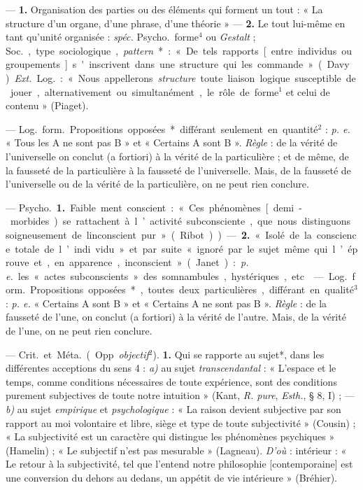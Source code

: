 \begin{itemize}[leftmargin=1cm, label=, itemsep=1pt]
 — {\bf 1.}  Organisation des parties ou des
éléments qui forment un tout : « La structure d’un organe, d'une phrase,
d’une théorie » —  {\bf 2.}  Le tout lui-même en tant qu'unité
organisée : {\it spéc.} \si{Psycho.} forme$^4$ ou {\it Gestalt} ; \si{Soc.},
type sociologique, {\it pattern}* : « De tels rapports [entre individus ou
groupements] s'inscrivent dans une structure qui les commande » (Davy).
{\it Ext.} \si{Log.} : « Nous appellerons {\it structure} toute liaison
logique susceptible de jouer, alternativement ou simultanément, le rôle de
forme$^1$ et celui de contenu » (Piaget).

 — \si{Log.} \si{form.} Propositions opposées*
différant seulement en quantité$^2$ : {\it p. e.} « Tous les A ne sont pas B
» et « Certains A sont B ». {\it Règle} : de la vérité de l’universelle on
conclut (a fortiori) à la vérité de la particulière ;
et de même, de la fausseté de la particulière à la fausseté de l’universelle.
Mais, de la fausseté de l’universelle ou de la vérité de la particulière, on
ne peut rien conclure.

 — \si{Psycho.} {\bf 1.} Faible ment conscient : « Ces
phénomènes [demi-morbides) se rattachent à l’activité subconsciente, que nous
distinguons soigneusement de linconscient pur » (Ribot)). — {\bf 2.} « Isolé
de la conscience totale de l’indi vidu » et par suite « ignoré par le. sujet
même qui l’éprouve et, en apparence, inconscient » (Janet) : {\it p. e.} les
« actes subconscients » des somnambules, hystériques, etc.

 — \si{Log.} \si{form.} Propositions
opposées*, toutes deux particulières, différant en qualité$^3$ : {\it p. e.}
« Certains A sont B » et « Certains A ne sont pas B ». {\it Règle} : de la
fausseté de l’une, on conclut (a fortiori) à la vérité de l’autre. Mais, de
la vérité de l’une, on ne peut rien conclure.

 — \si{Crit.} et \si{Méta.} (Opp. {\it objectif}$^2$). {\bf 1.}
Qui se rapporte au sujet*, dans les différentes acceptions du sens 4 :
{\it a)} au sujet {\it transcendantal} : « L'espace et le temps, comme
conditions nécessaires de toute expérience, sont des conditions purement
subjectives de toute notre intuition » (Kant, {\it R. pure}, {\it Esth.}, §
8, I) ; — {\it b)} au sujet {\it empirique} et {\it psychologique} : « La
raison devient subjective par son rapport au moi volontaire et libre, siège
et type de toute subjectivité » (Cousin) ; « La subjectivité est un caractère
qui distingue les phénomènes psychiques » (Hamelin) ; « Le subjectif n’est
pas mesurable » (Lagneau). {\it D'où} : intérieur : « Le retour
à la subjectivité, tel que l'entend notre philosophie [contemporaine] est une
conversion du dehors au dedans, un appétit de vie intérieure » (Bréhier).


\end{itemize}

